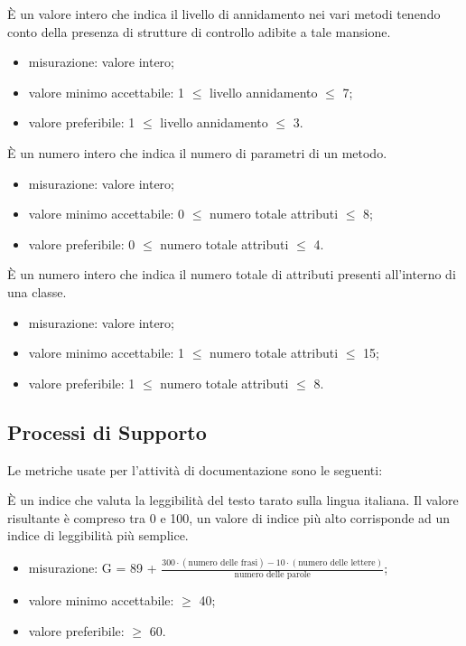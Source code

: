 		È un valore intero che indica il livello di annidamento nei vari metodi tenendo conto della presenza di strutture di controllo adibite a tale mansione.		
		\begin{itemize}
			\item{misurazione: valore intero;}
			\item{valore minimo accettabile: 1 $\leq$ livello annidamento $\leq$ 7;}
			\item{valore preferibile: 1 $\leq$ livello annidamento $\leq$ 3.}
		\end{itemize}
			
		È un numero intero che indica il numero di parametri di un metodo. 
		\begin{itemize}
			\item{misurazione: valore intero;}
			\item{valore minimo accettabile: 0 $\leq$ numero totale attributi $\leq$ 8;}
			\item{valore preferibile: 0 $\leq$ numero totale attributi $\leq$ 4.}
		\end{itemize}
			
		È un numero intero che indica il numero totale di attributi presenti all'interno di una classe.				\begin{itemize}
			\item{misurazione: valore intero;}
			\item{valore minimo accettabile: 1 $\leq$ numero totale attributi $\leq$ 15;}
			\item{valore preferibile: 1 $\leq$ numero totale attributi $\leq$ 8.}
		\end{itemize}

\subsection{Processi di Supporto}

	Le metriche usate per l'attività di documentazione sono le seguenti:
	
		È un indice che valuta la leggibilità del testo tarato sulla lingua italiana. Il valore risultante è compreso tra 0 e 100, un valore di indice più alto corrisponde ad un indice di leggibilità più semplice.
		 \begin{itemize}
			\item{misurazione: G = 89 + $\displaystyle\frac{300 \cdot{} (\mbox{numero delle frasi}) - 10 \cdot{} (\mbox{numero delle lettere})}{\mbox{numero delle parole}}$;}
			\item{valore minimo accettabile: $\geq$ 40;}
			\item{valore preferibile: $\geq$ 60.}
		\end{itemize}

